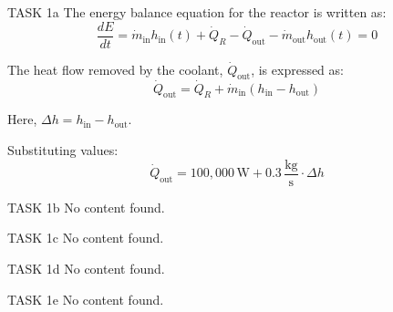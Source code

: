 TASK 1a  
The energy balance equation for the reactor is written as:  
\[
\frac{dE}{dt} = \dot{m}_{\text{in}} h_{\text{in}}(t) + \dot{Q}_R - \dot{Q}_{\text{out}} - \dot{m}_{\text{out}} h_{\text{out}}(t) = 0
\]  

The heat flow removed by the coolant, \( \dot{Q}_{\text{out}} \), is expressed as:  
\[
\dot{Q}_{\text{out}} = \dot{Q}_R + \dot{m}_{\text{in}} \left( h_{\text{in}} - h_{\text{out}} \right)
\]  

Here, \( \Delta h = h_{\text{in}} - h_{\text{out}} \).  

Substituting values:  
\[
\dot{Q}_{\text{out}} = 100,000 \, \text{W} + 0.3 \, \frac{\text{kg}}{\text{s}} \cdot \Delta h
\]  

TASK 1b  
No content found.  

TASK 1c  
No content found.  

TASK 1d  
No content found.  

TASK 1e  
No content found.  